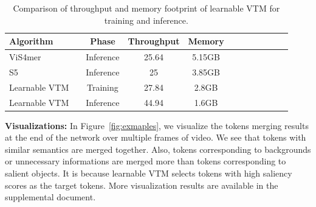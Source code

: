 \documentclass{article}
\begin{document}
\begin{table}[t]
\caption
    {
        Comparison of throughput and memory footprint of learnable VTM for training and inference.
    }
\centering
\footnotesize

    \begin{tabular}{@{} l c c c c c c c c c c c @{} }
        \toprule
        Algorithm && Phase & Throughput & Memory  \\
        \midrule
        ViS4mer~\citep{islam2022vis4mer} && Inference & 25.64 & 5.15GB \\
        S5~\citep{wang2023s5}      && Inference & 25 & 3.85GB \\
        Learnable VTM && Training & 27.84 & 2.8GB  \\ 
        Learnable VTM && Inference & 44.94 & 1.6GB \\
        \bottomrule
    \end{tabular} 
    \label{table:complexity}
    
\end{table}


\vspace{0.2cm}
\noindent\textbf{Visualizations:} In Figure~\ref{fig:exmaples}, we visualize the tokens merging results at the end of the network over multiple frames of video. We see that tokens with similar semantics are merged together. Also, tokens corresponding to backgrounds or unnecessary informations are merged more than tokens corresponding to salient objects. It is because learnable VTM selects tokens with high saliency scores as the target tokens. More visualization results are available in the supplemental document.
\end{document}
